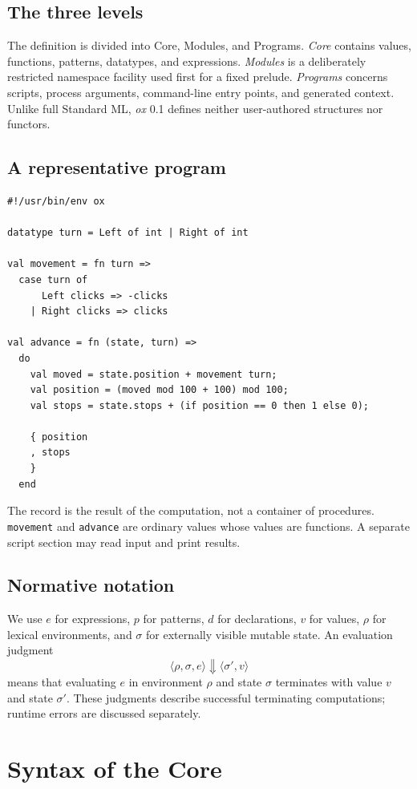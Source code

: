 \documentclass[11pt,oneside,openany]{book}
\newcommand{\ox}{\textit{ox}}
\newcommand{\kw}[1]{\texttt{#1}}
\newcommand{\state}{\sigma}
\newcommand{\env}{\rho}
\begin{document}
\section{The three levels}
The definition is divided into Core, Modules, and Programs. \emph{Core} contains values, functions, patterns, datatypes, and expressions. \emph{Modules} is a deliberately restricted namespace facility used first for a fixed prelude. \emph{Programs} concerns scripts, process arguments, command-line entry points, and generated context. Unlike full Standard ML, \ox{} 0.1 defines neither user-authored structures nor functors.

\section{A representative program}
\begin{lstlisting}
#!/usr/bin/env ox

datatype turn = Left of int | Right of int

val movement = fn turn =>
  case turn of
      Left clicks => -clicks
    | Right clicks => clicks

val advance = fn (state, turn) =>
  do
    val moved = state.position + movement turn;
    val position = (moved mod 100 + 100) mod 100;
    val stops = state.stops + (if position == 0 then 1 else 0);

    { position
    , stops
    }
  end
\end{lstlisting}
The record is the result of the computation, not a container of procedures. \kw{movement} and \kw{advance} are ordinary values whose values are functions. A separate script section may read input and print results.

\section{Normative notation}
We use $e$ for expressions, $p$ for patterns, $d$ for declarations, $v$ for values, $\env$ for lexical environments, and $\state$ for externally visible mutable state. An evaluation judgment
\[
\langle \env,\state,e\rangle\Downarrow\langle \state',v\rangle
\]
means that evaluating $e$ in environment $\env$ and state $\state$ terminates with value $v$ and state $\state'$. These judgments describe successful terminating computations; runtime errors are discussed separately.

\chapter{Syntax of the Core}
\end{document}
